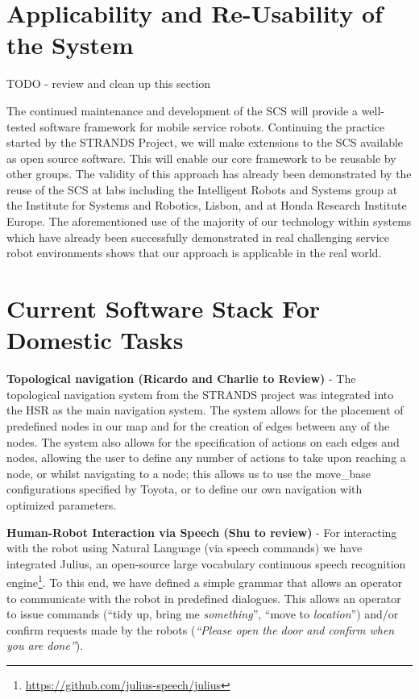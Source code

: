 \documentclass[runningheads,a4paper]{llncs}
\begin{document}
\section{Applicability and Re-Usability of the System}

TODO - review and clean up this section

The continued maintenance and development of the SCS will provide a well-tested software framework for mobile service robots. Continuing the practice started by the STRANDS Project, we will make extensions to the SCS available as open source software. This will enable our core framework to be reusable by other groups. The validity of this approach has already been demonstrated by the reuse of the SCS at labs including the Intelligent Robots and Systems group at the Institute for Systems and Robotics, Lisbon, and at Honda Research Institute Europe. The aforementioned use of the majority of our technology within systems which have already been successfully demonstrated in real challenging service robot environments shows that our approach is applicable in the real world.

\section{Current Software Stack For Domestic Tasks}\label{sec:current-software-stack-for-domestic-tasks}
\textbf{Topological navigation (Ricardo and Charlie to Review)} - The topological navigation system from the STRANDS project was integrated into the HSR as the main navigation system. The system allows for the placement of predefined nodes in our map and for the creation of edges between any of the nodes. The system also allows for the specification of actions on each edges and nodes, allowing the user to define any number of actions to take upon reaching a node, or whilst navigating to a node; this allows us to use the move\_base configurations specified by Toyota, or to define our own navigation with optimized parameters. 

\textbf{Human-Robot Interaction via Speech (Shu to review)} - For interacting with the robot using Natural Language (via speech commands) we have integrated Julius, an open-source large vocabulary continuous speech recognition engine\footnote{\url{https://github.com/julius-speech/julius}}. To this end, we have defined a simple grammar that allows an operator to communicate with the robot in predefined dialogues. This allows an operator to issue commands (``tidy up, bring me \emph{something}'', ``move to \emph{location}'') and/or confirm requests made by the robots (\emph{``Please open the door and confirm when you are done''}).
\end{document}
